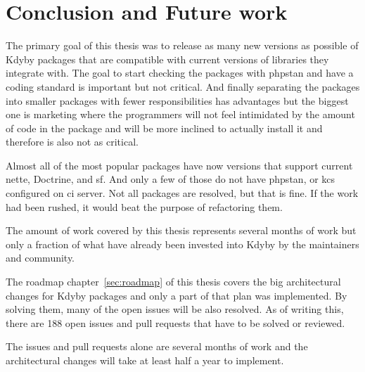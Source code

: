 \chapter{Conclusion and Future work}

The primary goal of this thesis was to release as many new versions as possible of Kdyby packages that are compatible with current versions of libraries they integrate with. The goal to start checking the packages with \gls{phpstan} and have a coding standard is important but not critical. And finally separating the packages into smaller packages with fewer responsibilities has advantages but the biggest one is marketing where the programmers will not feel intimidated by the amount of code in the package and will be more inclined to actually install it and therefore is also not as critical.

Almost all of the most popular packages have now versions that support current \gls{nette}, Doctrine, and \gls{sf}. And only a few of those do not have \gls{phpstan}, or \acrlong{kcs} configured on \gls{ci} server. Not all packages are resolved, but that is fine. If the work had been rushed, it would beat the purpose of refactoring them.

The amount of work covered by this thesis represents several months of work but only a fraction of what have already been invested into Kdyby by the maintainers and community.

The roadmap chapter~\ref{sec:roadmap} of this thesis covers the big architectural changes for Kdyby packages and only a part of that plan was implemented. By solving them, many of the open issues will be also resolved. As of writing this, there are 188 open issues and pull requests that have to be solved or reviewed.

The issues and pull requests alone are several months of work and the architectural changes will take at least half a year to implement.
